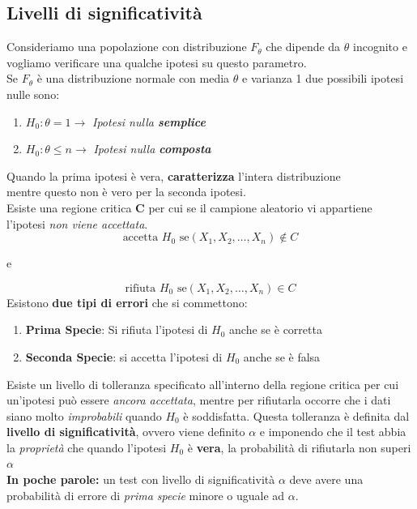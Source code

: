 \documentclass[]{article}
\begin{document}
    \subsection{Livelli di significatività}
    Consideriamo una popolazione con distribuzione $F_\theta$ che dipende da $\theta$ incognito e vogliamo verificare una qualche ipotesi su questo parametro. \\
    Se $F_\theta$ è una distribuzione normale con media $\theta$ e varianza 1 due possibili ipotesi nulle sono:
    \begin{enumerate}
        \item $H_0 : \theta = 1 \longrightarrow$ \textit{Ipotesi nulla \textbf{semplice}}
        \item $H_0 : \theta \leq n \longrightarrow$ \textit{Ipotesi nulla \textbf{composta}}
    \end{enumerate}
    Quando la prima ipotesi è vera, \textbf{caratterizza} l'intera distribuzione \\
    mentre questo non è vero per la seconda ipotesi. 
    \\[2ex]
    Esiste una regione critica \textbf{C} per cui se il campione aleatorio vi appartiene l'ipotesi \textit{non viene accettata}. \\
    \[ \text{accetta } H_0 \text{ se} (X_1, X_2, \ldots, X_n) \not \in C \]
    \centerline{e}
    \[ \text{rifiuta } H_0 \text{ se} (X_1, X_2, \ldots, X_n) \in C \]
    Esistono \textbf{due tipi di errori} che si commettono:
    \begin{enumerate}
        \item \textbf{Prima Specie}: Si rifiuta l'ipotesi di $H_0$ anche se è corretta
        \item \textbf{Seconda Specie}: si accetta l'ipotesi di $H_0$ anche se è falsa
    \end{enumerate}
    Esiste un livello di tolleranza specificato all'interno della regione critica per cui un'ipotesi può essere \textit{ancora accettata}, mentre per rifiutarla occorre che i dati siano molto \textit{improbabili} quando $H_0$ è soddisfatta.
    Questa tolleranza è definita dal \textbf{livello di significatività}, ovvero viene definito $\alpha$ e imponendo che il test abbia la \textit{proprietà} che quando l'ipotesi $H_0$ è \textbf{vera}, la probabilità di rifiutarla non superi $\alpha$ \\[2ex]
    \textbf{In poche parole:} un test con livello di significatività $\alpha$ deve avere una probabilità di errore di \textit{prima specie} minore o uguale ad $\alpha$.
\end{document}
